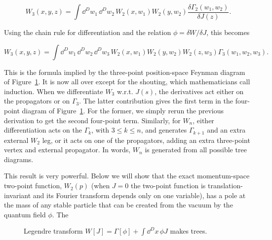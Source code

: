 \begin{equation}
W_3(x,y,z)=\int\dd^D w_1\,\dd^D w_2\,W_2(x,w_1)W_2(y,w_2)\frac{\delta\Gamma_2(w_1,w_2)}{\delta J(z)}.
\label{eq:3.37}
\end{equation}

Using the chain rule for differentiation and the relation $\phi=\delta W/\delta J$, this becomes

\begin{equation}
W_3(x,y,z)=\int\dd^D w_1\,\dd^D w_2\,\dd^D w_3\,W_2(x,w_1)W_2(y,w_2)W_2(z,w_3)\Gamma_3(w_1,w_2,w_3).
\label{eq:3.38}
\end{equation}

This is the formula implied by the three-point position-space Feynman diagram of
Figure~\ref{fig:3.1}.
It is now all over except for the shouting, which mathematicians call induction. When
we differentiate $W_3$ w.r.t. $J(s)$, the derivatives act either on the propagators or on $\Gamma_3$.
The latter contribution gives the first term in the four-point diagram of Figure~\ref{fig:3.1}. For
the former, we simply rerun the previous derivation to get the second four-point term.
Similarly, for $W_n$, either differentiation acts on the $\Gamma_k$, with $3\leq k\leq n$, and generates
$\Gamma_{k+1}$ and an extra external $W_2$ leg, or it acts on one of the propagators, adding an
extra three-point vertex and external propagator. In words, $W_n$ is generated from all
possible tree diagrams.

This result is very powerful. Below we will show that the exact momentum-space
two-point function, $W_2(p)$ (when $J=0$ the two-point function is translation-invariant
and its Fourier transform depends only on one variable), has a pole at the mass of
any stable particle that can be created from the vacuum by the quantum field $\phi$. The

\begin{figure}[htbp]
  \centering
  
  \caption{Legendre transform $W[J]=\Gamma[\phi]+\int\dd^D x\,\phi J$ makes trees.}
  \label{fig:3.1}
\end{figure}
